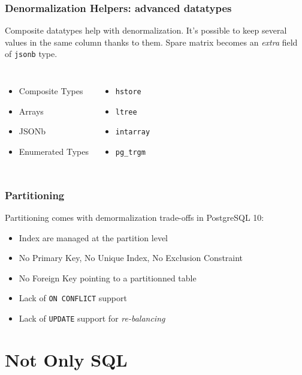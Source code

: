 \documentclass[xcolor=dvipsnames]{beamer}
\begin{document}
\begin{frame}[fragile]
  \frametitle{Denormalization Helpers: advanced datatypes}

  Composite datatypes help with denormalization. It's possible to keep
  several values in the same column thanks to them. Spare matrix becomes an
  \textit{extra} field of \texttt{jsonb} type.
  \vfill

  \begin{columns}[c]
    \begin{itemize}
    \item Composite Types
    \item Arrays
    \item JSONb
    \item Enumerated Types
    \end{itemize}
    \begin{itemize}
    \item \texttt{hstore}
    \item \texttt{ltree}
    \item \texttt{intarray}
    \item \texttt{pg\_trgm}
    \end{itemize}
  \end{columns}  
\end{frame}

\begin{frame}[fragile]
  \frametitle{Partitioning}

  Partitioning comes with demormalization trade-offs in PostgreSQL 10:
  \vfill

  \begin{itemize}
    \item Index are managed at the partition level
    \item No Primary Key, No Unique Index, No Exclusion Constraint
    \item No Foreign Key pointing to a partitionned table
    \item Lack of \texttt{ON CONFLICT} support
    \item Lack of \texttt{UPDATE} support for \textit{re-balancing}
  \end{itemize}
\end{frame}

\section{Not Only SQL}
\end{document}
